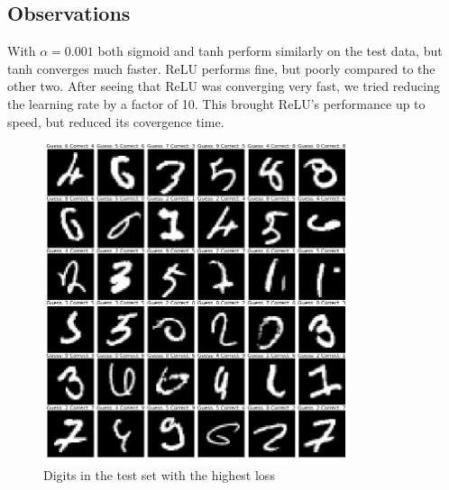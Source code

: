 \subsection{Observations}

With $\alpha = 0.001$ both sigmoid and tanh perform similarly on the test data, but
tanh converges much faster. ReLU performs fine, but poorly compared to the other two.
After seeing that ReLU was converging very fast, we tried reducing the learning rate
by a factor of 10. This brought ReLU's performance up to speed, but reduced its covergence time.

\begin{figure}[H]
	\centering
	\includegraphics[width=0.8\textwidth]{./images/highest_loss_digits.png}
	\caption{Digits in the test set with the highest loss}
	\label{fig:highest_loss_digits}
\end{figure}
